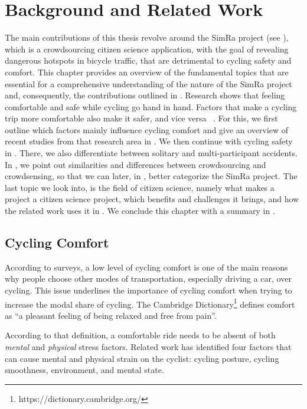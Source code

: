 \cleardoublepage
\chapter{Background and Related Work}
\label{cha:background}
The main contributions of this thesis revolve around the SimRa project (see ), which is a crowdsourcing citizen science application, with the goal of revealing dangerous hotspots in bicycle traffic, that are detrimental to cycling safety and comfort.
This chapter provides an overview of the fundamental topics that are essential for a comprehensive understanding of the nature of the SimRa project and, consequently, the contributions outlined in .
Research shows that feeling comfortable and safe while cycling go hand in hand.
Factors that make a cycling trip more comfortable also make it safer, and vice versa ~\cite{shoman2023evaluation, fitch2018relationship}.
For this, we first outline which factors mainly influence cycling comfort and give an overview of recent studies from that research area in .
We then continue with cycling safety in .
There, we also differentiate between solitary and multi-participant accidents.
In , we point out similarities and differences between crowdsourcing and crowdsensing, so that we can later, in , better categorize the SimRa project.
The last topic we look into, is the field of citizen science, namely what makes a project a citizen science project, which benefits and challenges it brings, and how the related work uses it in .
We conclude this chapter with a summary in .

\section{Cycling Comfort}
\label{sec:cycling_comfort_background}
According to surveys, a low level of cycling comfort is one of the main reasons why people choose other modes of transportation, especially driving a car, over cycling.
This issue underlines the importance of cycling comfort when trying to increase the modal share of cycling.
The Cambridge Dictionary\footnote{https://dictionary.cambridge.org/} defines comfort as
``a pleasant feeling of being relaxed and free from pain''.

According to that definition, a comfortable ride needs to be absent of both \textit{mental} and \textit{physical} stress factors.
Related work has identified four factors that can cause mental and physical strain on the cyclist: cycling posture, cycling smoothness, environment, and mental state.

